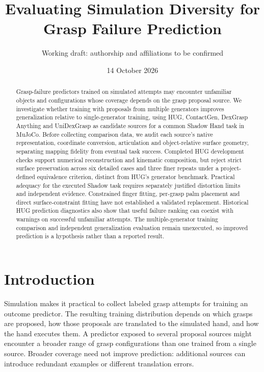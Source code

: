 \documentclass[10pt,letterpaper]{article}
\title{Evaluating Simulation Diversity for Grasp Failure Prediction}
\author{Working draft: authorship and affiliations to be confirmed}
\date{14 October 2026}
\begin{document}
\maketitle

\begin{abstract}
Grasp-failure predictors trained on simulated attempts may encounter unfamiliar
objects and configurations whose coverage depends on the grasp proposal source.
We investigate whether training with proposals from multiple generators improves
generalization relative to single-generator training, using HUG, ContactGen,
DexGrasp Anything and UniDexGrasp as candidate sources for a common Shadow Hand
task in MuJoCo. Before collecting comparison data, we audit each source's native
representation, coordinate conversion, articulation and object-relative surface
geometry, separating mapping fidelity from eventual task success.
Completed HUG development checks support numerical reconstruction and kinematic
composition, but reject strict surface preservation across six detailed cases
and three finer repeats under a project-defined equivalence criterion, distinct
from HUG's generator benchmark. Practical adequacy for the executed Shadow
task requires separately justified distortion limits and independent evidence.
Constrained finger fitting, per-grasp palm
placement and direct surface-constraint fitting have not established a
validated replacement. Historical HUG prediction diagnostics also
show that useful failure ranking can coexist with warnings on successful
unfamiliar attempts. The multiple-generator training comparison and independent
generalization evaluation remain unexecuted, so improved prediction is a
hypothesis rather than a reported result.
\end{abstract}


\section{Introduction}
Simulation makes it practical to collect labeled grasp attempts for training an
outcome predictor. The resulting training distribution depends on which grasps
are proposed, how those proposals are translated to the simulated hand, and how
the hand executes them. A predictor exposed to several proposal sources might
encounter a broader range of grasp configurations than one trained from a single
source. Broader coverage need not improve prediction: additional sources can
introduce redundant examples or different translation errors.
\end{document}

